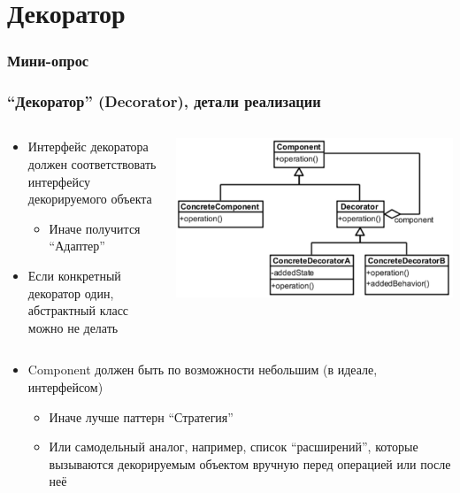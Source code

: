 \documentclass[xetex,mathserif,serif]{beamer}
\begin{document}
    \section{Декоратор}

    \begin{frame}
        \frametitle{Мини-опрос}
    \end{frame}

    \begin{frame}
        \frametitle{``Декоратор'' (Decorator), детали реализации}
        \begin{columns}
            \begin{column}{0.6\textwidth}
                \begin{itemize}
                    \item Интерфейс декоратора должен соответствовать интерфейсу декорируемого объекта
                    \begin{itemize}
                        \item Иначе получится ``Адаптер''
                    \end{itemize}
                    \item Если конкретный декоратор один, абстрактный класс можно не делать
                \end{itemize}
            \end{column}
            \begin{column}{0.4\textwidth}
                \begin{center}
                    \includegraphics[width=\textwidth]{decorator.png}
                \end{center}
            \end{column}
        \end{columns}
        \begin{itemize}
            \item Component должен быть по возможности небольшим (в идеале, интерфейсом)
            \begin{itemize}
                \item Иначе лучше паттерн ``Стратегия''
                \item Или самодельный аналог, например, список ``расширений'', которые вызываются декорируемым объектом вручную перед операцией или после неё
            \end{itemize}
        \end{itemize}
    \end{frame}
\end{document}
